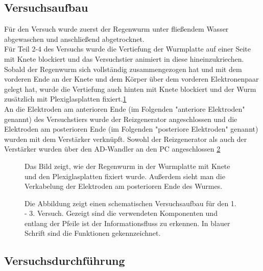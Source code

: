 \documentclass[11pt]{article}
\begin{document}
\subsection{Versuchsaufbau}
Für den Versuch wurde zuerst der Regenwurm unter fließendem Wasser abgewaschen und anschließend abgetrocknet.\\
Für Teil 2-4 des Versuchs wurde die Vertiefung der Wurmplatte auf einer Seite mit Knete blockiert und das Versuchstier animiert in diese hineinzukriechen. Sobald der Regenwurm sich vollständig zusammengezogen hat und mit dem vorderen Ende an der Knete und dem Körper über dem vorderen Elektronenpaar gelegt hat, wurde die Vertiefung auch hinten mit Knete blockiert und der Wurm zusätzlich mit Plexiglasplatten fixiert.\ref{foto} \\
An die Elektroden am anterioren Ende (im Folgenden "{}anteriore Elektroden"{} genannt) des Versuchstiers wurde der Reizgenerator angeschlossen und die Elektroden am posterioren Ende (im Folgenden "{}posteriore Elektroden"{} genannt) wurden mit dem Verstärker verknüpft. Sowohl der Reizgenerator als auch der Verstärker wurden über den AD-Wandler an den PC angeschlossen \ref{schema}
\begin{figure}[H]
\caption{Das Bild zeigt, wie der Regenwurm in der Wurmplatte mit Knete und den Plexiglasplatten fixiert wurde. Außerdem sieht man die Verkabelung der Elektroden am posterioren Ende des Wurmes. }
\label{foto}
\end{figure}
\begin{figure}[H]
\caption{Die Abbildung zeigt einen schematischen Versuchsaufbau für den 1. - 3. Versuch. Gezeigt sind die verwendeten Komponenten und entlang der Pfeile ist der Informationsfluss zu erkennen. In blauer Schrift sind die Funktionen gekennzeichnet. }
\label{schema}
\end{figure}


\subsection{Versuchsdurchführung}
\end{document}
